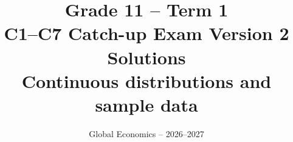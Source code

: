 \newcommand{\NorthDiagram}[2]{%
\begin{tikzpicture}[scale=0.85]
\fill[blue!30] (0,0)--({90-#1}:2) arc[start angle={90-#1},end angle={90+#1},radius=2]--cycle;
\draw[thick] (0,0) circle (2);
\draw[->] (0,0)--(90:2.65) node[above]{North ($0$)};
\draw[dashed] (0,0)--({90-#1}:2.2);
\draw[dashed] (0,0)--({90+#1}:2.2);
\node[anchor=west] at ({90-#1}:2.35){$+#2$};
\node[anchor=east] at ({90+#1}:2.35){$-#2$};
\node at (0,-2.45){Full circle: $360^\circ=2\pi$ rad};
\end{tikzpicture}}

\renewcommand{\ExponentialProbabilityGraph}[3]{%
\begin{center}\begin{tikzpicture}
\begin{axis}[width=11cm,height=4.8cm,axis lines=left,xmin=0,xmax={#3+2},ymin=0,ymax={1.35*#1},xlabel={$t$},ylabel={$f_T(t)$},xtick={0,#2,#3},ytick=\empty,clip=false]
\addplot[domain=#2:#3,samples=100,draw=none,fill=blue!30]{#1*exp(-#1*x)}\closedcycle;
\addplot[domain=0:{#3+2},samples=120,thick]{#1*exp(-#1*x)};
\addplot[dashed] coordinates {(#2,0)(#2,{#1*exp(-#1*#2)})};
\addplot[dashed] coordinates {(#3,0)(#3,{#1*exp(-#1*#3)})};
\node at (axis cs:{(#2+#3)/2},{0.20*#1}) {$P(#2<T<#3)$};
\node[anchor=west] at (axis cs:{0.25*(#2+#3)},{1.12*#1}) {$f_T(t)=#1e^{-#1t}$};
\end{axis}\end{tikzpicture}\end{center}}
\title{Grade 11 -- Term 1\\C1--C7 Catch-up Exam Version 2 Solutions\\\large Continuous distributions and sample data}
\author{Global Economics -- 2026--2027}
\date{}

\maketitle
{}\label{toc}\tableofcontents
\clearpage
